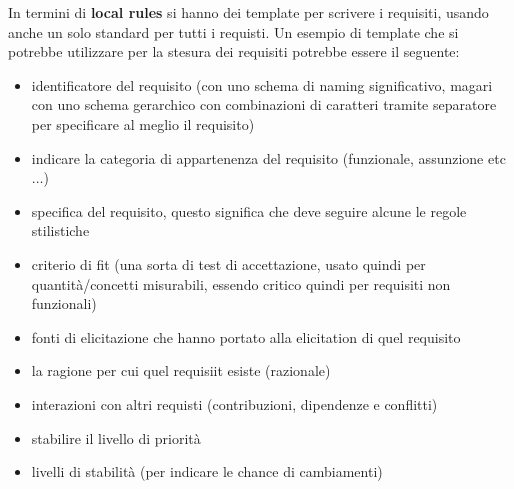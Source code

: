 In termini di \textbf{local rules} si hanno dei template per scrivere i requisiti, usando anche un solo standard per tutti i requisti. Un esempio di template che si potrebbe utilizzare per la stesura dei requisiti potrebbe essere il seguente:
\begin{itemize}
  \item identificatore del requisito (con uno schema di naming significativo, magari con uno schema gerarchico con combinazioni di caratteri tramite separatore per specificare al meglio il requisito)
  \item indicare la categoria di appartenenza del requisito (funzionale, assunzione etc$\ldots$)
  \item specifica del requisito, questo significa che deve seguire alcune le regole stilistiche
  \item criterio di fit (una sorta di test di accettazione, usato quindi per quantità/concetti misurabili, essendo critico quindi per requisiti non funzionali) 
  \item fonti di elicitazione che hanno portato alla elicitation di quel requisito
  \item la ragione per cui quel requisiit esiste (razionale)
  \item interazioni con altri requisti (contribuzioni, dipendenze e conflitti)
  \item stabilire il livello di priorità
  \item livelli di stabilità (per indicare le chance di cambiamenti)
\end{itemize}

